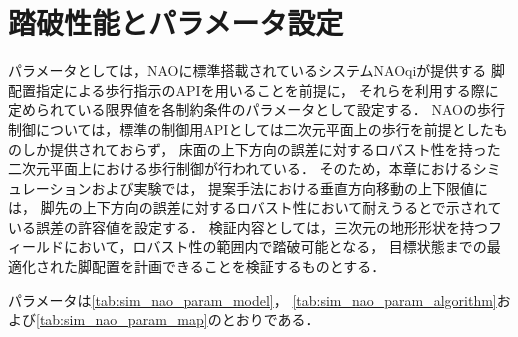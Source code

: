 \documentclass[autodetect-engine,dvipdfmx-if-dvi,ja=standard,a4j,jbase=11pt,magstyle=nomag*]{bxjsreport}
\begin{document}
\section{踏破性能とパラメータ設定}
パラメータとしては，NAOに標準搭載されているシステムNAOqiが提供する
脚配置指定による歩行指示のAPIを用いることを前提に，
それらを利用する際に定められている限界値を各制約条件のパラメータとして設定する\cite{nao_footstep}．
NAOの歩行制御については，標準の制御用APIとしては二次元平面上の歩行を前提としたものしか提供されておらず，
床面の上下方向の誤差に対するロバスト性を持った二次元平面上における歩行制御が行われている\cite{nao_feature}．
そのため，本章におけるシミュレーションおよび実験では，
提案手法における垂直方向移動の上下限値には，
脚先の上下方向の誤差に対するロバスト性において耐えうると\cite{nao_feature}で示されている誤差の許容値を設定する．
検証内容としては，三次元の地形形状を持つフィールドにおいて，ロバスト性の範囲内で踏破可能となる，
目標状態までの最適化された脚配置を計画できることを検証するものとする．

パラメータは\cref{tab:sim_nao_param_model}，
\cref{tab:sim_nao_param_algorithm}および\cref{tab:sim_nao_param_map}のとおりである．
\end{document}
